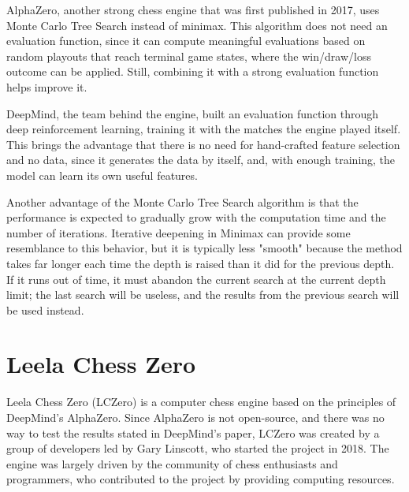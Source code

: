 AlphaZero, another strong chess engine that was first published in 2017, uses Monte Carlo Tree Search instead of minimax. This algorithm does not need an evaluation function, since it can compute meaningful evaluations based on random playouts that reach terminal game states, where the win/draw/loss outcome can be applied. Still, combining it with a strong evaluation function helps improve it.

DeepMind, the team behind the engine, built an evaluation function through deep reinforcement learning, training it with the matches the engine played itself. This brings the advantage that there is no need for hand-crafted feature selection and no data, since it generates the data by itself, and, with enough training, the model can learn its own useful features.

Another advantage of the Monte Carlo Tree Search algorithm is that the performance is expected to gradually grow with the computation time and the number of iterations. Iterative deepening in Minimax can provide some resemblance to this behavior, but it is typically less "smooth" because the method takes far longer each time the depth is raised than it did for the previous depth. If it runs out of time, it must abandon the current search at the current depth limit; the last search will be useless, and the results from the previous search will be used instead.


\section{Leela Chess Zero}
\label{sec:ch3sec3}

Leela Chess Zero (LCZero) is a computer chess engine based on the principles of DeepMind's AlphaZero. Since AlphaZero is not open-source, and there was no way to test the results stated in DeepMind's paper, LCZero was created by a group of developers led by Gary Linscott, who started the project in 2018. The engine was largely driven by the community of chess enthusiasts and programmers, who contributed to the project by providing computing resources.

